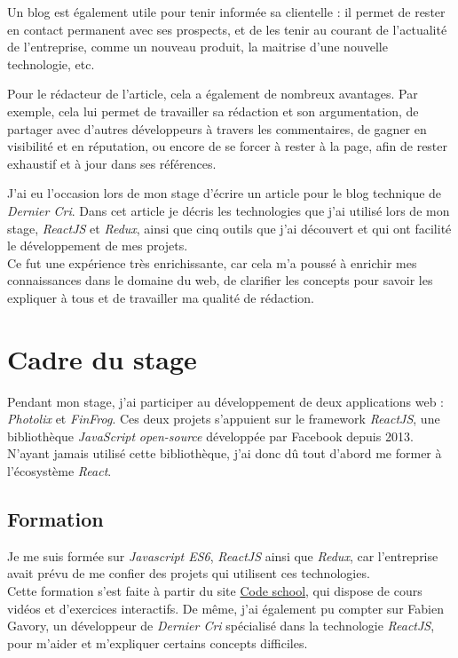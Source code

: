 \bigskip

Un blog est également utile pour tenir informée sa clientelle : il
permet de rester en contact permanent avec ses prospects, et de les
tenir au courant de l'actualité de l'entreprise, comme un nouveau
produit, la maitrise d'une nouvelle technologie, etc.

\bigskip

Pour le rédacteur de l'article, cela a également de nombreux avantages.
Par exemple, cela lui permet de travailler sa rédaction et son
argumentation, de partager avec d'autres développeurs à travers les
commentaires, de gagner en visibilité et en réputation, ou encore de se
forcer à rester à la page, afin de rester exhaustif et à jour dans ses
références.

\bigskip

J'ai eu l'occasion lors de mon stage d'écrire un article pour le blog
technique de \emph{Dernier Cri}. Dans cet article je décris les
technologies que j'ai utilisé lors de mon stage, \emph{ReactJS} et
\emph{Redux}, ainsi que cinq outils que j'ai découvert et qui ont
facilité le développement de mes projets.\\
Ce fut une expérience très enrichissante, car cela m'a poussé à enrichir
mes connaissances dans le domaine du web, de clarifier les concepts pour
savoir les expliquer à tous et de travailler ma qualité de rédaction.

\newpage

\section{Cadre du stage}\label{cadre-du-stage}

\bigskip

Pendant mon stage, j'ai participer au développement de deux applications
web : \emph{Photolix} et \emph{FinFrog}. Ces deux projets s'appuient sur
le framework \emph{ReactJS}, une bibliothèque \emph{JavaScript}
\emph{open-source} développée par Facebook depuis 2013. N'ayant jamais
utilisé cette bibliothèque, j'ai donc dû tout d'abord me former à
l'écosystème \emph{React}.

\bigskip

\subsection{Formation}\label{formation}

\bigskip

Je me suis formée sur \emph{Javascript ES6}, \emph{ReactJS} ainsi que
\emph{Redux}, car l'entreprise avait prévu de me confier des projets qui
utilisent ces technologies.\\
Cette formation s'est faite à partir du site
\href{https://www.codeschool.com/}{Code school}, qui dispose de cours
vidéos et d'exercices interactifs. De même, j'ai également pu compter
sur Fabien Gavory, un développeur de \emph{Dernier Cri} spécialisé dans
la technologie \emph{ReactJS}, pour m'aider et m'expliquer certains
concepts difficiles.


